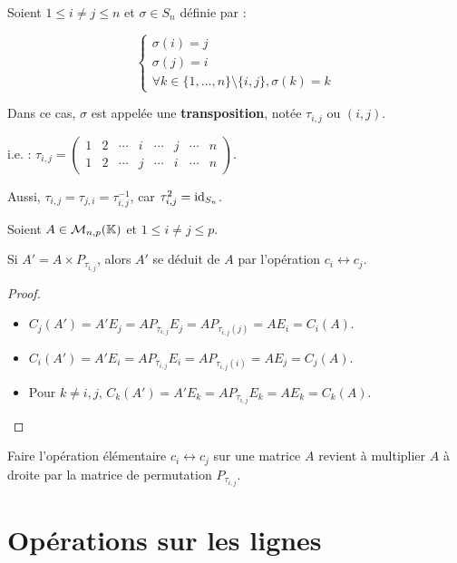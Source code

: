 \documentclass[12pt, a4paper]{report}
\begin{document}
\begin{remark}[Transposition]
    Soient $1 \le i \ne j \le n$ et $\sigma \in S_n$ définie par :

    $$\begin{cases} \sigma(i) = j \\ \sigma(j) = i \\ \forall k \in \{1,\dots,n\} \setminus \{i,j\}, \sigma(k) = k \end{cases}$$

    Dans ce cas, $\sigma$ est appelée une \textbf{transposition}, notée $\tau_{i,j}$ ou $(i,j)$.

    i.e. : $\tau_{i,j} = \left(\begin{matrix} 1 & 2 & \cdots & i & \cdots & j & \cdots & n \\ 1 & 2 & \cdots & j & \cdots & i & \cdots & n \end{matrix}\right)$.

    Aussi, $\tau_{i,j} = \tau_{j,i} = \tau^{-1}_{i,j}$, car $\tau^2_{i,j} = \mathrm{id}_{S_n}$.
\end{remark}

\begin{property}
    Soient $A \in \mathcal M_{n,p}(\mathbb{K})$ et $1 \le i \ne j \le p$.

    Si $A' = A \times P_{\tau_{i,j}}$, alors $A'$ se déduit de $A$ par l'opération $c_i \leftrightarrow c_j$.
\end{property}

\begin{proof}
    \begin{itemize}
        \item $C_j(A') = A' E_j = A P_{\tau_{i,j}} E_j = A P_{\tau_{i,j}(j)} = A E_i = C_i(A)$.
        \item $C_i(A') = A' E_i = A P_{\tau_{i,j}} E_i = A P_{\tau_{i,j}(i)} = A E_j = C_j(A)$.
        \item Pour $k \ne i,j$, $C_k(A') = A' E_k = A P_{\tau_{i,j}} E_k = A E_k = C_k(A)$.
    \end{itemize}
\end{proof}

\begin{remark}
    Faire l'opération élémentaire $c_i \leftrightarrow c_j$ sur une matrice $A$ revient à multiplier $A$ à droite par la matrice de permutation $P_{\tau_{i,j}}$.
\end{remark}

\section{Opérations sur les lignes}
\end{document}
